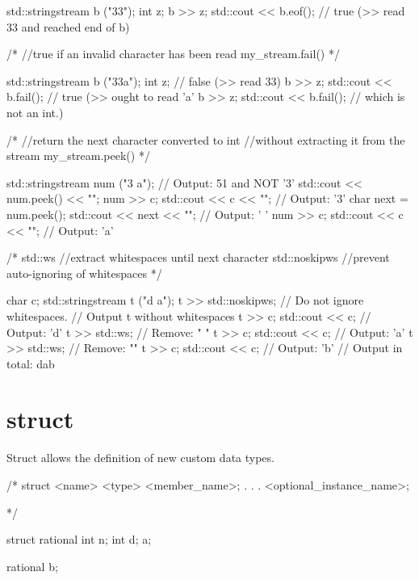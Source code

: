 \documentclass[10pt,a4paper]{scrartcl}
\begin{document}
\begin{multicols*}{2}
\begin{TPCpp}
std::stringstream b ("33");
int z;
b >> z; std::cout << b.eof(); 
// true (>> read 33 and reached end of b)
\end{TPCpp}

\begin{TPCpp}
/*
//true if an invalid character has been read
my_stream.fail()
*/

std::stringstream b ("33a");
int z;
// false (>> read 33)
b >> z; std::cout << b.fail(); 
// true (>> ought to read 'a'
b >> z; std::cout << b.fail(); 
// which is not an int.)
\end{TPCpp}

\begin{TPCpp}
/*
//return the next character converted to int
//without extracting it from the stream
my_stream.peek()
*/

std::stringstream num ("3 a");
// Output: 51 and NOT '3'
std::cout << num.peek() << "\n"; 
num >> c;
std::cout << c << "\n"; // Output: '3'
char next = num.peek();
std::cout << next << "\n"; // Output: ' '
num >> c;
std::cout << c << "\n"; // Output: 'a'
\end{TPCpp}

\begin{TPCpp}
/*
std::ws //extract whitespaces until next character
std::noskipws //prevent auto-ignoring of whitespaces
*/

char c;
std::stringstream t ("d a\n\nb");
t >> std::noskipws; // Do not ignore whitespaces.
// Output t without whitespaces
t >> c; std::cout << c; // Output: 'd'
t >> std::ws; // Remove: " "
t >> c; std::cout << c; // Output: 'a'
t >> std::ws; // Remove: "\n\n"
t >> c; std::cout << c; // Output: 'b'
// Output in total: dab
\end{TPCpp}

\section{struct}
\label{sec:struct}

Struct allows the definition of new custom data types.

\begin{TPCpp}
/* 
struct <name> {
	<type> <member_name>;
	.
	.
	.
}<optional_instance_name>;

*/

struct rational{
	int n;
	int d;
}a;

rational b;
\end{TPCpp}


\end{multicols*}
\end{document}
